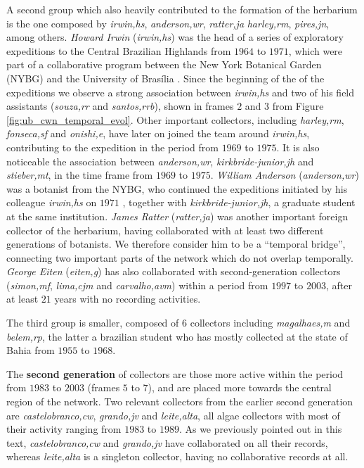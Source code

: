 A second group which also heavily contributed to the formation of the herbarium is the one composed by \textit{irwin,hs}, \textit{anderson,wr}, \textit{ratter,ja} \textit{harley,rm}, \textit{pires,jn}, among others.
\textit{Howard Irwin} (\textit{irwin,hs}) was the head of a series of exploratory expeditions to the Central Brazilian Highlands from $1964$ to $1971$, which were part of a collaborative program between the New York Botanical Garden (NYBG) and the University of Brasília \cite{Irwin1996}.
Since the beginning of the of the expeditions we observe a strong association between \textit{irwin,hs} and two of his field assistants (\textit{souza,rr} and \textit{santos,rrb}), shown in frames $2$ and $3$ from Figure \ref{fig:ub_cwn_temporal_evol}.
Other important collectors, including \textit{harley,rm}, \textit{fonseca,sf} and \textit{onishi,e}, have later on joined the team around \textit{irwin,hs}, contributing to the expedition in the period from $1969$ to $1975$.
%
It is also noticeable the association between \textit{anderson,wr}, \textit{kirkbride-junior,jh} and \textit{stieber,mt}, in the time frame from $1969$ to $1975$.
\textit{William Anderson} (\textit{anderson,wr}) was a botanist from the NYBG, who continued the expeditions initiated by his colleague \textit{irwin,hs} on $1971$ \cite{Irwin1996}, together with \textit{kirkbride-junior,jh}, a graduate student at the same institution.
%
\textit{James Ratter} (\textit{ratter,ja}) was another important foreign collector of the herbarium, having collaborated with at least two different generations of botanists.
We therefore consider him to be a ``temporal bridge'', connecting two important parts of the network which do not overlap temporally.
\textit{George Eiten} (\textit{eiten,g}) has also collaborated with second-generation collectors (\textit{simon,mf}, \textit{lima,cjm} and \textit{carvalho,avm}) within a period from $1997$ to $2003$, after at least $21$ years with no recording activities.

The third group is smaller, composed of $6$ collectors including \textit{magalhaes,m} and \textit{belem,rp}, the latter a brazilian student who has mostly collected at the state of Bahia from $1955$ to $1968$.

The \textbf{second generation} of collectors are those more active within the period from $1983$ to $2003$ (frames $5$ to $7$), and are placed more towards the central region of the network.
%
Two relevant collectors from the earlier second generation are \textit{castelobranco,cw}, \textit{grando,jv} and \textit{leite,alta}, all algae collectors with most of their activity ranging from $1983$ to $1989$.
As we previously pointed out in this text, \textit{castelobranco,cw} and \textit{grando,jv} have collaborated on all their records, whereas \textit{leite,alta} is a singleton collector, having no collaborative records at all.

